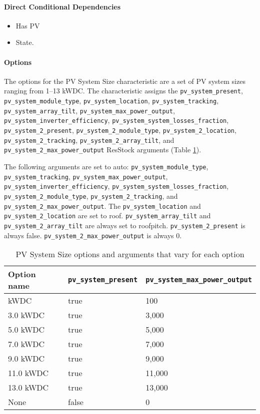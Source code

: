 \paragraph{Direct Conditional Dependencies}
\begin{itemize}
    \item Has PV
    \item State.
\end{itemize}

\paragraph{Options}
The options for the PV System Size characteristic are a set of PV system sizes ranging from 1--13 kWDC. The characteristic assigns the \texttt{pv\_system\_present}, \texttt{pv\_system\_module\_type}, \texttt{pv\_system\_location}, \texttt{pv\_system\_tracking}, \texttt{pv\_system\_array\_tilt}, \texttt{pv\_system\_max\_power\_output}, \texttt{pv\_system\_inverter\_efficiency}, \texttt{pv\_system\_system\_losses\_fraction}, \texttt{pv\_system\_2\_present}, \texttt{pv\_system\_2\_module\_type}, \texttt{pv\_system\_2\_location}, \texttt{pv\_system\_2\_tracking}, \texttt{pv\_system\_2\_array\_tilt}, and \texttt{pv\_system\_2\_max\_power\_output} ResStock arguments (Table \ref{table:hc_opt_def_pv_size}). 

The following arguments are set to auto: \texttt{pv\_system\_module\_type}, \texttt{pv\_system\_tracking}, \texttt{pv\_system\_max\_power\_output}, \texttt{pv\_system\_inverter\_efficiency}, \texttt{pv\_system\_system\_losses\_fraction}, \texttt{pv\_system\_2\_module\_type}, \texttt{pv\_system\_2\_tracking}, and \texttt{pv\_system\_2\_max\_power\_output}. The \texttt{pv\_system\_location} and \texttt{pv\_system\_2\_location} are set to roof. \texttt{pv\_system\_array\_tilt} and \texttt{pv\_system\_2\_array\_tilt} are always set to roofpitch. \texttt{pv\_system\_2\_present} is always false. \texttt{pv\_system\_2\_max\_power\_output} is always 0.

\begin{longtable}[]{ |p{2.5cm}|p{4cm}|p{4cm}| }
\caption{PV System Size options and arguments that vary for each option} \label{table:hc_opt_def_pv_size} \\
\toprule\noalign{}
Option name & \texttt{pv\_system\_present} &
\texttt{pv\_system\_max\_power\_output} \\
\midrule\noalign{}
\endhead
\bottomrule\noalign{}
\endlastfoot
1.0 kWDC & true & 100\\
3.0 kWDC & true & 3,000 \\
5.0 kWDC & true & 5,000 \\
7.0 kWDC & true & 7,000 \\
9.0 kWDC & true & 9,000 \\
11.0 kWDC &true & 11,000 \\
13.0 kWDC & true & 13,000 \\
None & false & 0 \\
\end{longtable}

